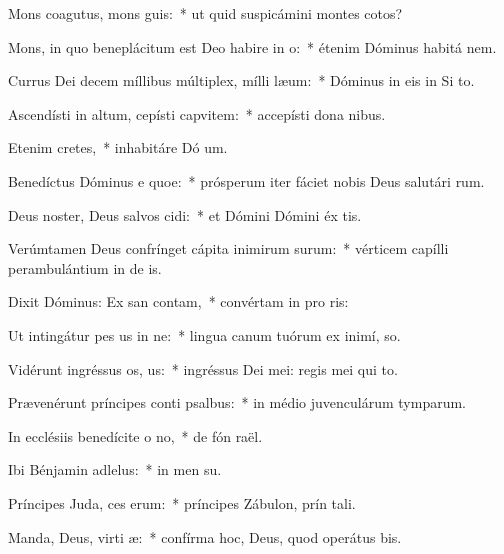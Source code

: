 \item Mons coagutus, mons guis:~* ut quid suspicámini montes cotos?
\item Mons, in quo beneplácitum est Deo habire in o:~* étenim Dóminus habitá  nem.
\item Currus Dei decem míllibus múltiplex, mílli læum:~* Dóminus in eis in Si  to.
\item Ascendísti in altum, cepísti capvitem:~* accepísti dona  nibus.
\item Etenim  cretes,~* inhabitáre Dó um.
\item Benedíctus Dóminus e quoe:~* prósperum iter fáciet nobis Deus salutári rum.
\item Deus noster, Deus salvos cidi:~* et Dómini Dómini éx tis.
\item Verúmtamen Deus confrínget cápita inimirum surum:~* vérticem capílli perambulántium in de is.
\item Dixit Dóminus: Ex san contam,~* convértam in pro ris:
\item Ut intingátur pes us in ne:~* lingua canum tuórum ex inimí,  so.
\item Vidérunt ingréssus os, us:~* ingréssus Dei mei: regis mei qui   to.
\item Prævenérunt príncipes conti psalbus:~* in médio juvenculárum tymparum.
\item In ecclésiis benedícite o no,~* de fón raël.
\item Ibi Bénjamin adlelus:~* in men su.
\item Príncipes Juda, ces erum:~* príncipes Zábulon, prín tali.
\item Manda, Deus, virti æ:~* confírma hoc, Deus, quod operátus   bis.
